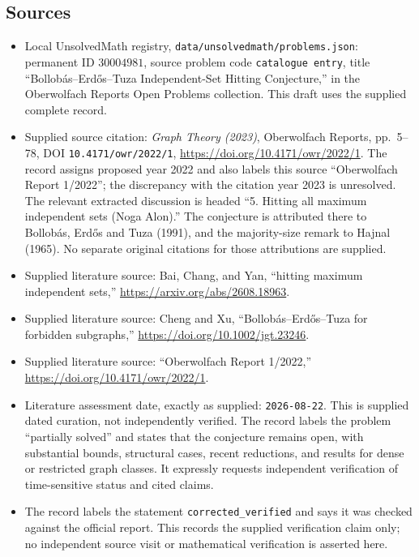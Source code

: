 \documentclass[11pt]{article}
\begin{document}
\subsection{Sources}
\begin{itemize}
\item Local UnsolvedMath registry, \texttt{data/unsolvedmath/problems.json}: permanent ID \(30004981\), source problem code \texttt{catalogue entry}, title ``Bollob\'{a}s--Erd\H{o}s--Tuza Independent-Set Hitting Conjecture,'' in the Oberwolfach Reports Open Problems collection. This draft uses the supplied complete record.
\item Supplied source citation: \emph{Graph Theory (2023)}, Oberwolfach Reports, pp.\ 5--78, DOI \texttt{10.4171/owr/2022/1}, \url{https://doi.org/10.4171/owr/2022/1}. The record assigns proposed year 2022 and also labels this source ``Oberwolfach Report 1/2022''; the discrepancy with the citation year 2023 is unresolved. The relevant extracted discussion is headed ``5. Hitting all maximum independent sets (Noga Alon).'' The conjecture is attributed there to Bollob\'{a}s, Erd\H{o}s and Tuza (1991), and the majority-size remark to Hajnal (1965). No separate original citations for those attributions are supplied.
\item Supplied literature source: Bai, Chang, and Yan, ``hitting maximum independent sets,'' \url{https://arxiv.org/abs/2608.18963}.
\item Supplied literature source: Cheng and Xu, ``Bollob\'{a}s--Erd\H{o}s--Tuza for forbidden subgraphs,'' \url{https://doi.org/10.1002/jgt.23246}.
\item Supplied literature source: ``Oberwolfach Report 1/2022,'' \url{https://doi.org/10.4171/owr/2022/1}.
\item Literature assessment date, exactly as supplied: \texttt{2026-08-22}. This is supplied dated curation, not independently verified. The record labels the problem ``partially solved'' and states that the conjecture remains open, with substantial bounds, structural cases, recent reductions, and results for dense or restricted graph classes. It expressly requests independent verification of time-sensitive status and cited claims.
\item The record labels the statement \texttt{corrected\_verified} and says it was checked against the official report. This records the supplied verification claim only; no independent source visit or mathematical verification is asserted here.
\end{itemize}
\end{document}
